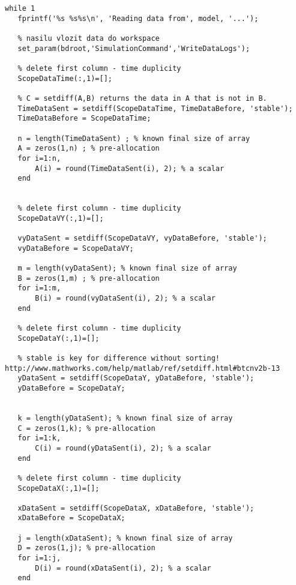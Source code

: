 \begin{algorithm}
%
\begin{lstlisting}
while 1
   fprintf('%s %s%s\n', 'Reading data from', model, '...');
   
   % nasilu vlozit data do workspace
   set_param(bdroot,'SimulationCommand','WriteDataLogs');
   
   % delete first column - time duplicity
   ScopeDataTime(:,1)=[];
   
   % C = setdiff(A,B) returns the data in A that is not in B.
   TimeDataSent = setdiff(ScopeDataTime, TimeDataBefore, 'stable');
   TimeDataBefore = ScopeDataTime;
   
   n = length(TimeDataSent) ; % known final size of array
   A = zeros(1,n) ; % pre-allocation
   for i=1:n,
       A(i) = round(TimeDataSent(i), 2); % a scalar
   end
   
   
   % delete first column - time duplicity
   ScopeDataVY(:,1)=[];
   
   vyDataSent = setdiff(ScopeDataVY, vyDataBefore, 'stable');
   vyDataBefore = ScopeDataVY;
   
   m = length(vyDataSent); % known final size of array
   B = zeros(1,m) ; % pre-allocation
   for i=1:m,
       B(i) = round(vyDataSent(i), 2); % a scalar
   end
   
   % delete first column - time duplicity
   ScopeDataY(:,1)=[];
   
   % stable is key for difference without sorting! http://www.mathworks.com/help/matlab/ref/setdiff.html#btcnv2b-13
   yDataSent = setdiff(ScopeDataY, yDataBefore, 'stable');
   yDataBefore = ScopeDataY;
   
   
   k = length(yDataSent); % known final size of array
   C = zeros(1,k); % pre-allocation
   for i=1:k,
       C(i) = round(yDataSent(i), 2); % a scalar 
   end
   
   % delete first column - time duplicity
   ScopeDataX(:,1)=[];
   
   xDataSent = setdiff(ScopeDataX, xDataBefore, 'stable');
   xDataBefore = ScopeDataX;
   
   j = length(xDataSent); % known final size of array
   D = zeros(1,j); % pre-allocation
   for i=1:j,
       D(i) = round(xDataSent(i), 2); % a scalar
   end
   

\end{lstlisting}
\end{algorithm}
